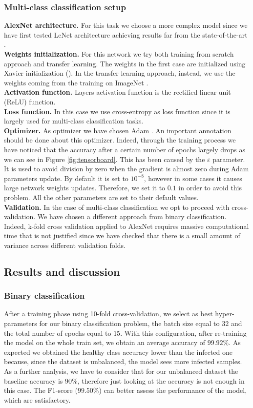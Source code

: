 \subsubsection{Multi-class classification setup}
\textbf{AlexNet architecture.}
For this task we choose a more complex model since we have first tested LeNet architecture achieving results far from the state-of-the-art \cite{ref11}.
\\
\textbf{Weights initialization.}
For this network we try both training from scratch approach and transfer learning. The weights in the first case are initialized using Xavier initialization (\cite{ref31}). In the transfer learning approach, instead, we use the weights coming from the training on ImageNet \cite{imagenet}.
\\
\textbf{Activation function.}
Layers activation function is the rectified linear unit (ReLU) function.
\\
\textbf{Loss function.}
In this case we use cross-entropy as loss function since it is largely used for multi-class classification tasks.
\\
\textbf{Optimizer.}
As optimizer we have chosen Adam \cite{ref32}. An important annotation should be done about this optimizer. Indeed, through the training process we have noticed that the accuracy after a certain number of epochs largely drops as we can see in Figure \ref{fig:tensorboard}. This has been caused by the $\varepsilon$ parameter. It is used to avoid division by zero when the gradient is almost zero during Adam parameters update. By default it is set to $10^{-8}$, however in some cases it causes large network weights updates. Therefore, we set it to $0.1$ in order to avoid this problem. All the other parameters are set to their default values.
\\
\textbf{Validation.}
In the case of multi-class classification we opt to proceed with cross-validation. We have chosen a different approach from binary classification. Indeed, k-fold cross validation applied to AlexNet requires massive computational time that is not justified since we have checked that there is a small amount of variance across different validation folds.
\subsection{Results and discussion}
\subsubsection{Binary classification}
After a training phase using 10-fold cross-validation, we select as best hyper-parameters for our binary classification problem, the batch size equal to $32$ and the total number of epochs equal to $15$. With this configuration, after re-training the model on the whole train set, we obtain an average accuracy of $99.92\%$. As expected we obtained the healthy class accuracy lower than the infected one because, since the dataset is unbalanced, the model sees more infected samples. As a further analysis, we have to consider that for our unbalanced dataset the baseline accuracy is 90\%, therefore just looking at the accuracy is not enough in this case. The F1-score ($99.50\%$) can better assess the performance of the model, which are satisfactory.
